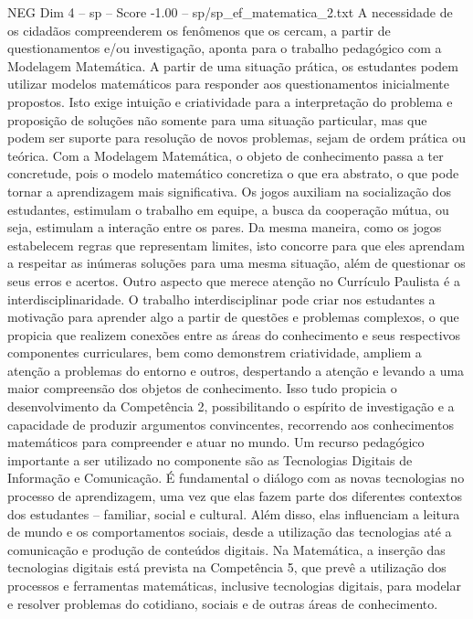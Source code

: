 \begin{textsample}{NEG Dim 4 – sp – Score -1.00 – sp/sp\_ef\_matematica\_2.txt}
A necessidade de os cidadãos compreenderem os fenômenos que os cercam, a partir de questionamentos e/ou investigação, aponta para o trabalho pedagógico com a Modelagem Matemática.
A partir de uma situação prática, os estudantes podem utilizar modelos matemáticos para responder aos questionamentos inicialmente propostos.
Isto exige intuição e criatividade para a interpretação do problema e proposição de soluções não somente para uma situação particular, mas que podem ser suporte para resolução de novos problemas, sejam de ordem prática ou teórica.
Com a Modelagem Matemática, o objeto de conhecimento passa a ter concretude, pois o modelo matemático concretiza o que era abstrato, o que pode tornar a aprendizagem mais significativa.
Os jogos auxiliam na socialização dos estudantes, estimulam o trabalho em equipe, a busca da cooperação mútua, ou seja, estimulam a interação entre os pares.
Da mesma maneira, como os jogos estabelecem regras que representam limites, isto concorre para que eles aprendam a respeitar as inúmeras soluções para uma mesma situação, além de questionar os seus erros e acertos.
Outro aspecto que merece atenção no Currículo Paulista é a interdisciplinaridade.
O trabalho interdisciplinar pode criar nos estudantes a motivação para aprender algo a partir de questões e problemas complexos, o que propicia que realizem conexões entre as áreas do conhecimento e seus respectivos componentes curriculares, bem como demonstrem criatividade, ampliem a atenção a problemas do entorno e outros, despertando a atenção e levando a uma maior compreensão dos objetos de conhecimento.
Isso tudo propicia o desenvolvimento da Competência 2, possibilitando o espírito de investigação e a capacidade de produzir argumentos convincentes, recorrendo aos conhecimentos matemáticos para compreender e atuar no mundo.
Um recurso pedagógico importante a ser utilizado no componente são as Tecnologias Digitais de Informação e Comunicação.
É fundamental o diálogo com as novas tecnologias no processo de aprendizagem, uma vez que elas fazem parte dos diferentes contextos dos estudantes – familiar, social e cultural.
Além disso, elas influenciam a leitura de mundo e os comportamentos sociais, desde a utilização das tecnologias até a comunicação e produção de conteúdos digitais.
Na Matemática, a inserção das tecnologias digitais está prevista na Competência 5, que prevê a utilização dos processos e ferramentas matemáticas, inclusive tecnologias digitais, para modelar e resolver problemas do cotidiano, sociais e de outras áreas de conhecimento.

\end{textsample}
